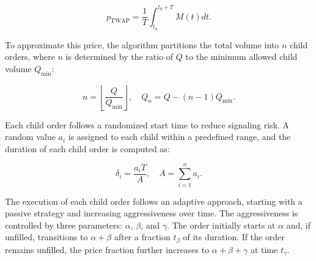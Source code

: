 \begin{equation}
    p_{\text{TWAP}} = \frac{1}{T} \int_{t_0}^{t_0+T} M(t) dt.
    \label{eq: TWQP price}
\end{equation}

To approximate this price, the algorithm partitions the total volume into $n$ child orders, where $n$ is determined by the ratio of $Q$ to the minimum allowed child volume $Q_{\min}$:

\begin{equation}
    n = \left\lfloor \frac{Q}{Q_{\min}} \right\rfloor, \quad Q_n = Q - (n-1) Q_{\min}.
    \label{eq: Q_n}
\end{equation}

Each child order follows a randomized start time to reduce signaling risk. A random value $a_i$ is assigned to each child within a predefined range, and the duration of each child order is computed as:

\begin{equation}
    \delta_i = \frac{a_i T}{A}, \quad A = \sum_{i=1}^{n} a_i.
    \label{eq:sigma and A}
\end{equation}

The execution of each child order follows an adaptive approach, starting with a passive strategy and increasing aggressiveness over time. The aggressiveness is controlled by three parameters: $\alpha$, $\beta$, and $\gamma$. The order initially starts at $\alpha$ and, if unfilled, transitions to $\alpha + \beta$ after a fraction $t_{\beta}$ of its duration. If the order remains unfilled, the price fraction further increases to $\alpha + \beta + \gamma$ at time $t_{\gamma}$.


